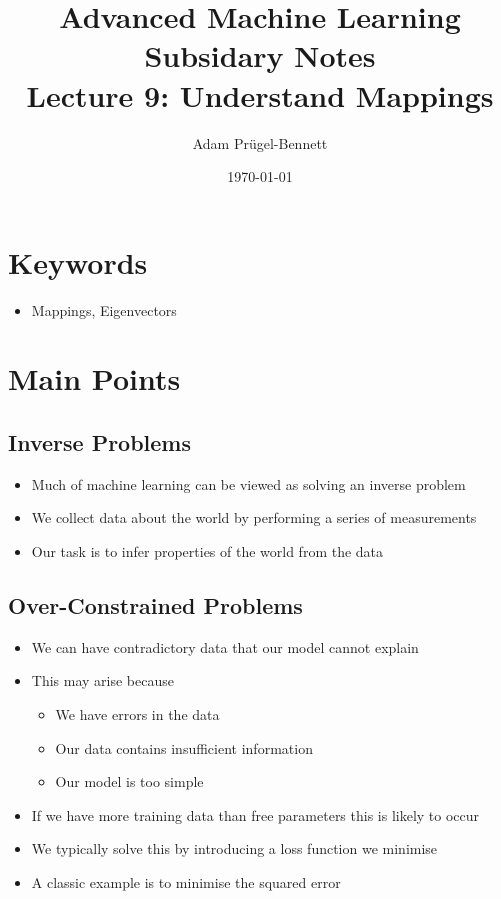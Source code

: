 \documentclass[11pt]{article}
\author{Adam Prügel-Bennett}
\date{\today}
\title{Advanced Machine Learning Subsidary Notes\\\medskip
\large Lecture 9: Understand Mappings}
\begin{document}
\maketitle


\section{Keywords}
\label{sec:orge0104e5}
\begin{itemize}
\item Mappings, Eigenvectors
\end{itemize}

\section{Main Points}
\label{sec:org4ab381b}

\subsection{Inverse Problems}
\label{sec:org847b268}
\begin{itemize}
\item Much of machine learning can be viewed as solving an inverse problem
\item We collect data about the world by performing a series of measurements
\item Our task is to infer properties of the world from the data
\end{itemize}

\subsection{Over-Constrained Problems}
\label{sec:org445cb81}
\begin{itemize}
\item We can have contradictory data that our model cannot explain
\item This may arise because
\begin{itemize}
\item We have errors in the data
\item Our data contains insufficient information
\item Our model is too simple
\end{itemize}
\item If we have more training data than free parameters this is likely to occur
\item We typically solve this by introducing a loss function we minimise
\item A classic example is to minimise the squared error
\end{itemize}
\end{document}
